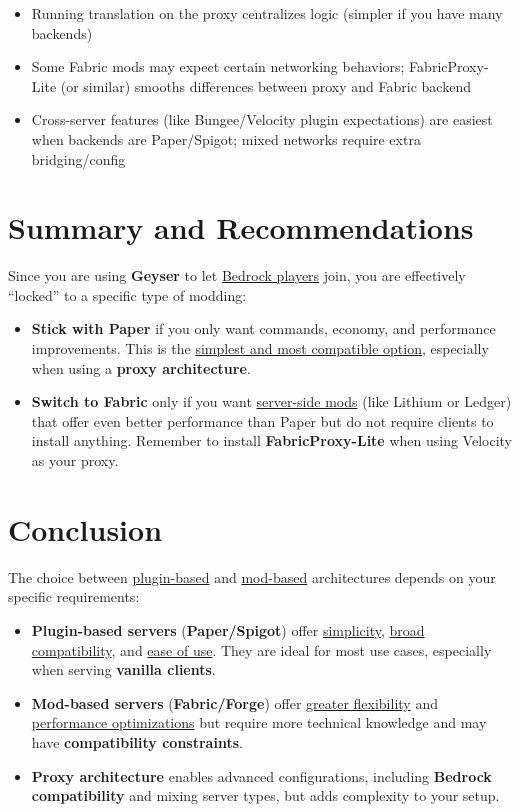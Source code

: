\documentclass{article}
\begin{document}
\begin{itemize}
    \item Running translation on the proxy centralizes logic (simpler if you have many backends)
    \item Some Fabric mods may expect certain networking behaviors; FabricProxy-Lite (or similar) smooths differences between proxy and Fabric backend
    \item Cross-server features (like Bungee/Velocity plugin expectations) are easiest when backends are Paper/Spigot; mixed networks require extra bridging/config
\end{itemize}


\newpage
\section{Summary and Recommendations}

Since you are using \textbf{Geyser} to let \uline{Bedrock players} join, you are effectively ``locked'' to a specific type of modding:

\begin{itemize}
    \item \textbf{Stick with Paper} if you only want commands, economy, and performance improvements. This is the \uline{simplest and most compatible option}, especially when using a \textbf{proxy architecture}.
    \item \textbf{Switch to Fabric} only if you want \uline{server-side mods} (like Lithium or Ledger) that offer even better performance than Paper but do not require clients to install anything. Remember to install \textbf{FabricProxy-Lite} when using Velocity as your proxy.
\end{itemize}

\section{Conclusion}

The choice between \uline{plugin-based} and \uline{mod-based} architectures depends on your specific requirements:

\begin{itemize}
    \item \textbf{Plugin-based servers} (\textbf{Paper/Spigot}) offer \uline{simplicity}, \uline{broad compatibility}, and \uline{ease of use}. They are ideal for most use cases, especially when serving \textbf{vanilla clients}.
    \item \textbf{Mod-based servers} (\textbf{Fabric/Forge}) offer \uline{greater flexibility} and \uline{performance optimizations} but require more technical knowledge and may have \textbf{compatibility constraints}.
    \item \textbf{Proxy architecture} enables advanced configurations, including \textbf{Bedrock compatibility} and mixing server types, but adds complexity to your setup.
\end{itemize}
\end{document}
